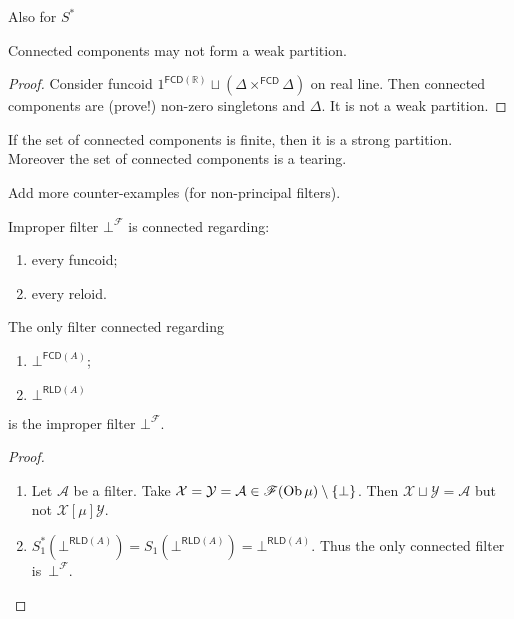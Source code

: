 Also for $S^{\ast}$

\begin{example}
  Connected components may not form a weak partition.
\end{example}

\begin{proof}
  Consider funcoid $1^{\mathsf{FCD}(\mathbb{R})}\sqcup(\Delta \times^{\mathsf{FCD}} \Delta)$ on real line.
  Then connected components are (prove!) non-zero singletons and $\Delta$. It
  is not a weak partition.
\end{proof}

\begin{conjecture}
If the set of connected components is finite, then it is
a strong partition. Moreover the set of connected
components is a tearing.
\end{conjecture}

Add more counter-examples (for non-principal filters).

\begin{obvious}
Improper filter $\bot^{\mathscr{F}}$ is connected regarding:
\begin{enumerate}
  \item every funcoid;
  \item every reloid.
\end{enumerate}{\hspace*{\fill}}{\medskip}
\end{obvious}

\begin{prop}
  The only filter connected regarding
  \begin{enumerate}
    \item $\bot^{\mathsf{FCD} (A)}$;
    \item $\bot^{\mathsf{RLD} (A)}$
  \end{enumerate}
  is the improper filter $\bot^{\mathscr{F}}$.
\end{prop}

\begin{proof}
  ~
  \begin{enumerate}
    \item Let $\mathcal{A}$ be a filter. Take $\mathcal{X} = \mathcal{Y} =
    \mathcal{A} \in \mathscr{F} (\operatorname{Ob} \mu) \setminus \{ \bot \}$. Then
    $\mathcal{X} \sqcup \mathcal{Y} = \mathcal{A}$ but not $\mathcal{X}
    \mathrel{[\mu]} \mathcal{Y}$.

    \item $S^{\ast}_1 (\bot^{\mathsf{RLD} (A)}) = S_1
    (\bot^{\mathsf{RLD} (A)}) = \bot^{\mathsf{RLD} (A)}$. Thus
    the only connected filter is~$\bot^{\mathscr{F}}$.
  \end{enumerate}
\end{proof}

